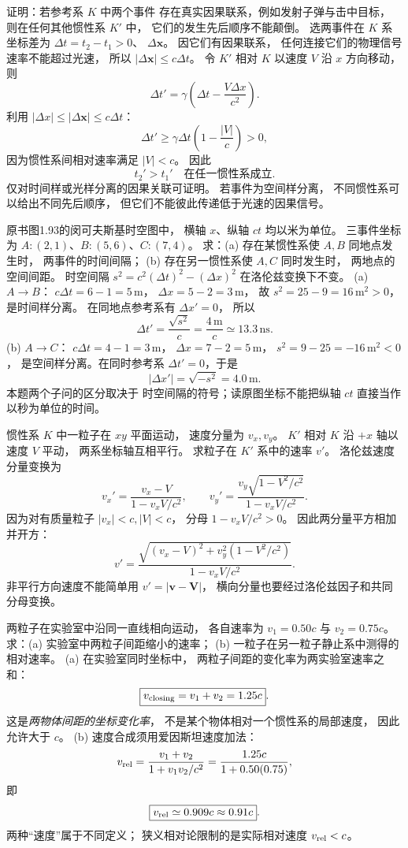 证明：若参考系 $K$ 中两个事件
存在真实因果联系，例如发射子弹与击中目标，
则在任何其他惯性系 $K'$ 中，
它们的发生先后顺序不能颠倒。
\exsolution
选两事件在 $K$ 系坐标差为
$\Delta t=t_2-t_1>0$、
$\Delta\bm x$。
因它们有因果联系，
任何连接它们的物理信号速率不能超过光速，
所以
$|\Delta\bm x|\le c\Delta t$。
令 $K'$ 相对 $K$ 以速度 $V$ 沿 $x$ 方向移动，
则
\[
\Delta t'=\gamma\left(
\Delta t-\frac{V\Delta x}{c^2}\right).
\]
利用 $|\Delta x|\le|\Delta\bm x|\le c\Delta t$：
\[
\Delta t'\ge
\gamma\Delta t\left(1-\frac{|V|}{c}\right)>0,
\]
因为惯性系间相对速率满足 $|V|<c$。
因此
\[
\boxed{t_2'>t_1'\quad\text{在任一惯性系成立}}.
\]
\excheck 仅对时间样或光样分离的因果关联可证明。
若事件为空间样分离，
不同惯性系可以给出不同先后顺序，
但它们不能彼此传递低于光速的因果信号。

原书图1.93的闵可夫斯基时空图中，
横轴 $x$、纵轴 $ct$ 均以米为单位。
三事件坐标为
$A:(2,1)$、$B:(5,6)$、$C:(7,4)$。
求：(a) 存在某惯性系使 $A,B$ 同地点发生时，
两事件的时间间隔；
(b) 存在另一惯性系使 $A,C$ 同时发生时，
两地点的空间间距。
\exsolution
时空间隔
$s^2=c^2(\Delta t)^2-(\Delta x)^2$
在洛伦兹变换下不变。
(a) $A\to B$：
$c\Delta t=6-1=5\,\mathrm m$，
$\Delta x=5-2=3\,\mathrm m$，
故 $s^2=25-9=16\,\mathrm{m^2}>0$，
是时间样分离。
在同地点参考系有 $\Delta x'=0$，
所以
\[
\boxed{\Delta t'=\frac{\sqrt{s^2}}{c}
=\frac{4\,\mathrm m}{c}
\simeq13.3\,\mathrm{ns}}.
\]
(b) $A\to C$：
$c\Delta t=4-1=3\,\mathrm m$，
$\Delta x=7-2=5\,\mathrm m$，
$s^2=9-25=-16\,\mathrm{m^2}<0$，
是空间样分离。在同时参考系
$\Delta t'=0$，于是
\[
\boxed{|\Delta x'|=\sqrt{-s^2}=4.0\,\mathrm m}.
\]
\excheck 本题两个子问的区分取决于
时空间隔的符号；读原图坐标不能把纵轴 $ct$
直接当作以秒为单位的时间。

惯性系 $K$ 中一粒子在 $xy$ 平面运动，
速度分量为 $v_x,v_y$。
$K'$ 相对 $K$ 沿 $+x$ 轴以速度 $V$ 平动，
两系坐标轴互相平行。
求粒子在 $K'$ 系中的速率 $v'$。
\exsolution
洛伦兹速度分量变换为
\[
v_x'=\frac{v_x-V}{1-v_xV/c^2},
\qquad
v_y'=\frac{v_y\sqrt{1-V^2/c^2}}{1-v_xV/c^2}.
\]
因为对有质量粒子
$|v_x|<c,|V|<c$，
分母 $1-v_xV/c^2>0$。
因此两分量平方相加并开方：
\[
\boxed{v'=\frac{
\sqrt{(v_x-V)^2+v_y^2(1-V^2/c^2)}
}{1-v_xV/c^2}}.
\]
\excheck 非平行方向速度不能简单用
$v'=|\bm v-\bm V|$，
横向分量也要经过洛伦兹因子和共同分母变换。

两粒子在实验室中沿同一直线相向运动，
各自速率为 $v_1=0.50c$ 与 $v_2=0.75c$。
求：(a) 实验室中两粒子间距缩小的速率；
(b) 一粒子在另一粒子静止系中测得的相对速率。
\exsolution
(a) 在实验室同时坐标中，
两粒子间距的变化率为两实验室速率之和：
\[
\boxed{v_{\rm closing}=v_1+v_2
=1.25c}.
\]
这是\emph{两物体间距的坐标变化率}，
不是某个物体相对一个惯性系的局部速度，
因此允许大于 $c$。
(b) 速度合成须用爱因斯坦速度加法：
\[
v_{\rm rel}=\frac{v_1+v_2}{1+v_1v_2/c^2}
=\frac{1.25c}{1+0.50(0.75)},
\]
即
\[
\boxed{v_{\rm rel}\simeq0.909c\approx0.91c}.
\]
\excheck 两种“速度”属于不同定义；
狭义相对论限制的是实际相对速度 $v_{\rm rel}<c$。

